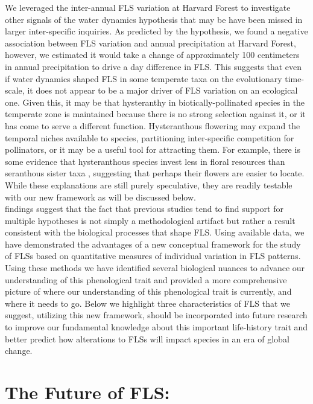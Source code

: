\documentclass{article}
\begin{document}
{\noindent We leveraged the inter-annual FLS variation at Harvard Forest to investigate other signals of the water dynamics hypothesis that may be have been missed in larger inter-specific inquiries. As predicted by the hypothesis, we found a negative association between FLS variation and annual precipitation at Harvard Forest, however, we estimated it would take a change of approximately 100 centimeters in annual precipitation to drive a day difference in FLS. This suggests that even if water dynamics shaped FLS in some temperate taxa on the evolutionary time-scale, it does not appear to be a major driver of FLS variation on an ecological one. Given this, it may be that hysteranthy in biotically-pollinated species in the temperate zone is maintained because there is no strong selection against it, or it has come to serve a different function. Hysteranthous flowering may expand the temporal niches available to species, partitioning inter-specific competition for pollinators, or it may be a useful tool for attracting them. For example, there is some evidence that hysteranthous species invest less in floral resources than seranthous sister taxa \citep{Gunatilleke1984}, suggesting that perhaps their flowers are easier to locate. While these explanations are still purely speculative, they are readily testable with our new framework as will be discussed below.\\

\noindentOur findings suggest that the fact that previous studies tend to find support for multiple hypotheses is not simply a methodological artifact but rather a result consistent with the biological processes that shape FLS. Using available data, we have demonstrated the advantages of a new conceptual framework for the study of FLSs based on quantitative measures of individual variation in FLS patterns. Using these methods we have identified several biological nuances to advance our understanding of this phenological trait and provided a more comprehensive picture of where our understanding of this phenological trait is currently, and where it needs to go. Below we highlight three characteristics of FLS that we suggest, utilizing this new framework, should be incorporated into future research to improve our fundamental knowledge about this important life-history trait and better predict how alterations to FLSs will impact species in an era of global change.
\section*{The Future of FLS:}
}
\end{document}
